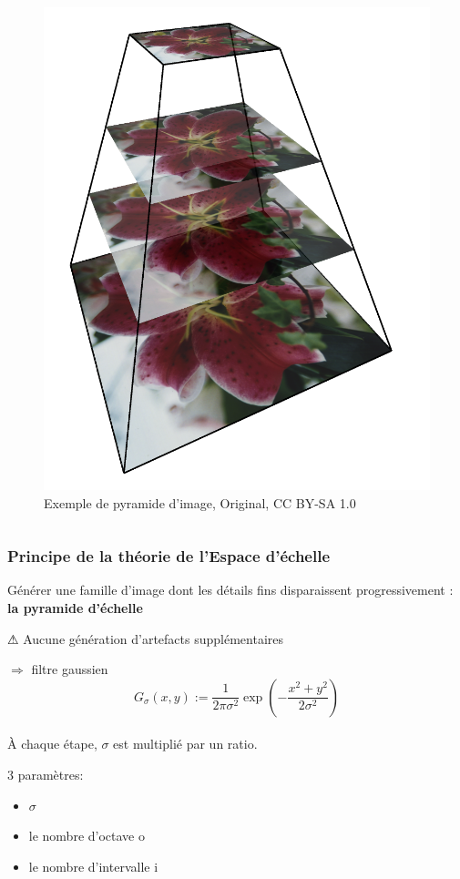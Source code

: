\documentclass{beamer}
\begin{document}
\begin{frame}
\begin{columns}
		\begin{figure}
			\includegraphics[scale=0.12]{img.png}
			\caption{Exemple de pyramide d'image, Original, CC BY-SA 1.0}
		\end{figure}

\end{columns}
\end{frame}

\begin{frame}

		\frametitle{Principe de la théorie de l'Espace d'échelle}
		\begin{center}
		Générer une famille d'image dont les détails fins disparaissent progressivement : \textbf{la pyramide d'échelle}\\
		\end{center}

		⚠ Aucune génération d'artefacts supplémentaires 
		
		$\Rightarrow$ filtre gaussien\\
		
		\[G_{\sigma}(x,y):=\frac{1}{2\pi\sigma^{2}}\exp(-\frac{x^{2}+y^{2}}{2\sigma^{2}})\]\\

		\`{A} chaque étape, $\sigma$ est multiplié par un ratio.

		3 paramètres: 
		\begin{itemize}
			\item $\sigma$
			\item le nombre d'octave o
			\item le nombre d'intervalle i
		\end{itemize}

	\end{frame}
\end{document}
